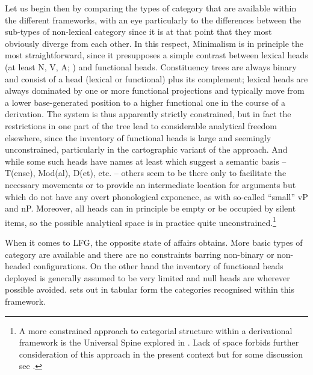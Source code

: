 \documentclass[output=paper]{langsci/langscibook}
\begin{document}
Let us begin then by comparing the types of category that are available within
the different frameworks, with an eye particularly to the differences between
the sub-types of non-lexical category since it is at that point that they most
obviously diverge from each other. In this respect, Minimalism is in principle
the most straightforward, since it presupposes a simple contrast between
lexical heads (at least N, V, A; \citealt[303--325]{Baker03}) and functional
heads.  Constituency trees are always binary and consist
of a head (lexical or functional) plus its complement; lexical heads are always
dominated by one or more functional projections and typically move from a lower
base-generated position to a higher functional one in the course of a
derivation. The system is thus apparently strictly constrained, but in fact the
restrictions in one part of the tree lead to considerable analytical freedom
elsewhere, since the inventory of functional heads is
large and seemingly unconstrained, particularly in the cartographic variant of
the approach. And while some such heads have names at least which suggest a
semantic basis -- T(ense), Mod(al), D(et), etc. -- others seem to be there only
to facilitate the necessary movements or to provide an intermediate location
for arguments but which do not have any overt phonological exponence, as with
so-called \enquote{small} vP and nP. Moreover, all heads can in principle be
empty or be occupied by silent items, so the possible analytical space is in
practice quite unconstrained.\footnote{A more constrained approach to
    categorial structure within a derivational framework is the Universal Spine
explored in \cite{Wiltschko14}. Lack of space forbids further consideration of
this approach in the present context but for some discussion see
\cite{Vincent18}.}

When it comes to \gls{LFG}, the opposite state
of affairs obtains. More basic types of category are available and there are no
constraints barring non-binary or non-headed configurations. On the other hand
the inventory of functional heads deployed is generally assumed to be very
limited and null heads are wherever possible avoided.  sets
out in tabular form the categories recognised within this framework.
\end{document}
